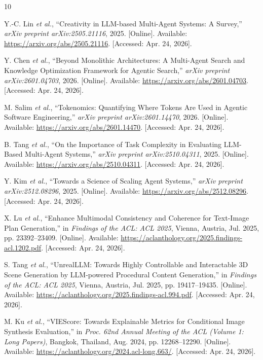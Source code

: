 \documentclass[12pt,a4paper]{article}
\begin{document}
\begin{thebibliography}{10}

Y.-C. Lin \textit{et al.}, ``Creativity in LLM-based Multi-Agent Systems: A Survey,'' \textit{arXiv preprint arXiv:2505.21116}, 2025. [Online]. Available: \url{https://arxiv.org/abs/2505.21116}. [Accessed: Apr. 24, 2026].

Y. Chen \textit{et al.}, ``Beyond Monolithic Architectures: A Multi-Agent Search and Knowledge Optimization Framework for Agentic Search,'' \textit{arXiv preprint arXiv:2601.04703}, 2026. [Online]. Available: \url{https://arxiv.org/abs/2601.04703}. [Accessed: Apr. 24, 2026].

M. Salim \textit{et al.}, ``Tokenomics: Quantifying Where Tokens Are Used in Agentic Software Engineering,'' \textit{arXiv preprint arXiv:2601.14470}, 2026. [Online]. Available: \url{https://arxiv.org/abs/2601.14470}. [Accessed: Apr. 24, 2026].

B. Tang \textit{et al.}, ``On the Importance of Task Complexity in Evaluating LLM-Based Multi-Agent Systems,'' \textit{arXiv preprint arXiv:2510.04311}, 2025. [Online]. Available: \url{https://arxiv.org/abs/2510.04311}. [Accessed: Apr. 24, 2026].

Y. Kim \textit{et al.}, ``Towards a Science of Scaling Agent Systems,'' \textit{arXiv preprint arXiv:2512.08296}, 2025. [Online]. Available: \url{https://arxiv.org/abs/2512.08296}. [Accessed: Apr. 24, 2026].

X. Lu \textit{et al.}, ``Enhance Multimodal Consistency and Coherence for Text-Image Plan Generation,'' in \textit{Findings of the ACL: ACL 2025}, Vienna, Austria, Jul. 2025, pp. 23392--23409. [Online]. Available: \url{https://aclanthology.org/2025.findings-acl.1202.pdf}. [Accessed: Apr. 24, 2026].

S. Tang \textit{et al.}, ``UnrealLLM: Towards Highly Controllable and Interactable 3D Scene Generation by LLM-powered Procedural Content Generation,'' in \textit{Findings of the ACL: ACL 2025}, Vienna, Austria, Jul. 2025, pp. 19417--19435. [Online]. Available: \url{https://aclanthology.org/2025.findings-acl.994.pdf}. [Accessed: Apr. 24, 2026].

M. Ku \textit{et al.}, ``VIEScore: Towards Explainable Metrics for Conditional Image Synthesis Evaluation,'' in \textit{Proc. 62nd Annual Meeting of the ACL (Volume 1: Long Papers)}, Bangkok, Thailand, Aug. 2024, pp. 12268--12290. [Online]. Available: \url{https://aclanthology.org/2024.acl-long.663/}. [Accessed: Apr. 24, 2026].


\end{thebibliography}
\end{document}
